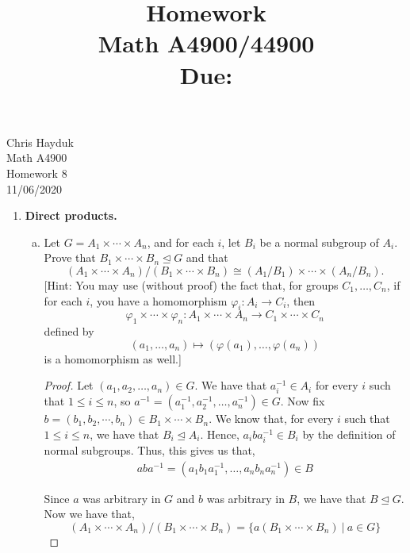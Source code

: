 \documentclass[11pt, reqno]{amsart}
\title[Homework \HW]{Homework \HW \\
Math A4900/44900\\
\small Due: \DUE}
\author{}
\theoremstyle{plain}
\theoremstyle{definition}
\theoremstyle{example}
\def\normeq{\unlhd}
\def\HW{8}
\def\DUE{11/06/2020}
\begin{document}
\begin{flushright}
Chris Hayduk\\
Math A4900\\
Homework \HW\\
\DUE
\end{flushright}





\begin{enumerate}[1.]
\item \textbf{Direct products.}
\begin{enumerate}[(a)]
\item Let $G = A_1 \times \cdots \times A_n$, and for each $i$, let $B_i$ be a normal subgroup of $A_i$. Prove that $B_1 \times \cdots \times B_n \normeq G$ and that 
$$(A_1 \times \cdots \times A_n)/(B_1 \times \cdots \times B_n) \cong (A_1/B_1) \times \cdots \times (A_n/B_n).$$
{[Hint: 
You may use (without proof) the fact that, for groups $C_1, \dots, C_n$, if  for each $i$, you have a homomorphism $\varphi_i: A_i \to C_i$, then 
$$\varphi_1 \times \cdots \times \varphi_n: A_1 \times \cdots \times A_n \to C_1 \times \cdots \times C_n$$
defined by 
$$(a_1, \dots, a_n) \mapsto (\varphi(a_1), \dots, \varphi(a_n))$$
is a homomorphism as well.]}

\begin{proof}
Let $(a_1, a_2, \ldots, a_n) \in G$. We have that $a_i^{-1} \in A_i$ for every $i$ such that $1 \leq i \leq n$, so $a^{-1} = (a_1^{-1}, a_2^{-1}, \ldots, a_n^{-1}) \in G$. Now fix $b = (b_1, b_2, \cdots, b_n) \in B_1 \times \cdots \times B_n$. We know that, for every $i$ such that $1 \leq i \leq n$, we have that $B_i \normeq A_i$. Hence, $a_iba_i^{-1} \in B_i$ by the definition of normal subgroups. Thus, this gives us that,
\begin{align*}
aba^{-1} = (a_1b_1a_1^{-1}, \ldots, a_nb_na_n^{-1}) \in B
\end{align*}

Since $a$ was arbitrary in $G$ and $b$ was arbitrary in $B$, we have that $B \normeq G$.\\

Now we have that, 
$$(A_1 \times \cdots \times A_n)/(B_1 \times \cdots \times B_n) = \{a(B_1 \times \cdots \times B_n) \ | \ a \in G\}$$ 


\end{proof}
\end{enumerate}
\end{enumerate}
\end{document}
